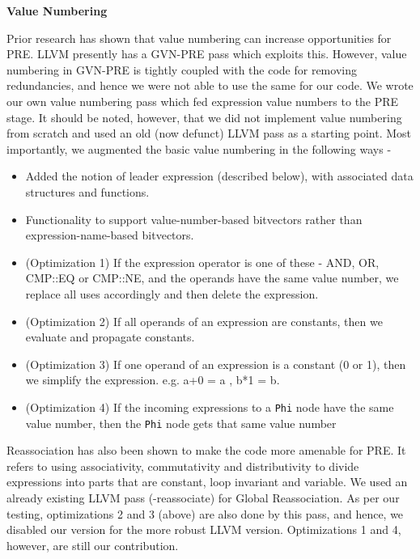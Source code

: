 \documentclass[10pt,twoside]{report}
\begin{document}
\begin{flushleft}
\textbf{\large{Value Numbering}}
\end{flushleft}

Prior research \cite{Briggs2} has shown that value numbering can increase opportunities for PRE.
LLVM presently has a GVN-PRE pass which exploits this. However, value numbering in 
GVN-PRE is tightly coupled with the code for removing redundancies, and hence
we were not able to use the same for our code. We wrote our own value numbering
pass which fed expression value numbers to the PRE stage. It should be noted,
however, that we did not implement value numbering from scratch and used an
old (now defunct) LLVM pass as a starting point. Most importantly, we
augmented the basic value numbering in the following ways - 
     
\begin{itemize}     
  \item Added the notion of leader expression (described below), with associated
  data structures and functions. 
  \item Functionality to support value-number-based bitvectors rather than
  expression-name-based bitvectors. 
  \item (Optimization 1) If the expression operator is one of these - AND, OR, CMP::EQ
  or CMP::NE, and the operands have the same value number, we replace all uses
  accordingly and then delete the expression.
  \item (Optimization 2) If all operands of an expression are constants, then we 
  evaluate and propagate constants. 
  \item (Optimization 3) If one operand of an expression is a constant (0 or 1), then 
  we simplify the expression. e.g. {a+0 = a} , {b*1 = b}.
  \item (Optimization 4) If the incoming expressions to a \texttt{Phi} node have the same value 
  number, then the \texttt{Phi} node gets that same value number
\end{itemize}  

  Reassociation has also been shown to make the code more amenable for PRE. It refers to 
using associativity, commutativity and distributivity to divide expressions into parts that are
constant, loop invariant and variable. We used an already existing LLVM pass (-reassociate)
  for Global Reassociation. As per our testing, optimizations 2 and 3 (above) are also done by 
 this pass, and hence, we disabled our version for the more robust LLVM version. Optimizations 1 and 4, 
however, are still our contribution.
\end{document}
